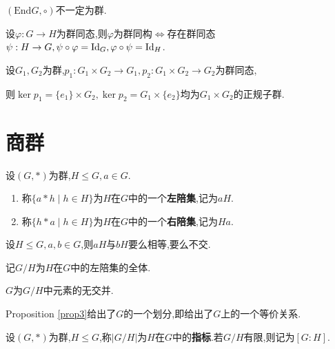 \begin{rqq}
    $(\mathrm{End} G, \circ)$不一定为群.
\end{rqq}

\begin{prop}
    设$\varphi: G \to H$为群同态,则$\varphi$为群同构$\iff$存在群同态$\psi: H \to G, \psi \circ \varphi = \operatorname{Id}_G, \varphi \circ \psi = \operatorname{Id}_H$.
\end{prop}

\begin{prop}
    设$G_1, G_2$为群,$p_1: G_1 \times G_2 \to G_1, p_2: G_1 \times G_2 \to G_2$为群同态,
    
    则$\ker p_1 = \{ e_1 \} \times G_2, \ker p_2 = G_1 \times \{ e_2 \}$均为$G_1 \times G_2$的正规子群.
\end{prop}

\section{商群}

\begin{deff}
    设$(G, *)$为群,$H \leqslant G, a \in G$.
    \begin{enumerate}
        \item 称$\{ a * h \mid h \in H \}$为$H$在$G$中的一个\textbf{左陪集},记为$aH$.
        \item 称$\{ h * a \mid h \in H \}$为$H$在$G$中的一个\textbf{右陪集},记为$Ha$.
    \end{enumerate}
\end{deff}

\begin{prop}
    设$H \leqslant G, a, b \in G$,则$aH$与$bH$要么相等,要么不交.
\end{prop}

\begin{deff}
    记$G / H$为$H$在$G$中的左陪集的全体.
\end{deff}

\begin{prop}\label{prop3}
    $G$为$G / H$中元素的无交并.
\end{prop}

\begin{rqq}
    Proposition \ref{prop3}给出了$G$的一个划分,即给出了$G$上的一个等价关系.
\end{rqq}

\begin{deff}
    设$(G, *)$为群,$H \leqslant G$,称$\lvert G / H \rvert$为$H$在$G$中的\textbf{指标}.若$G / H$有限,则记为$[G : H]$.
\end{deff}

